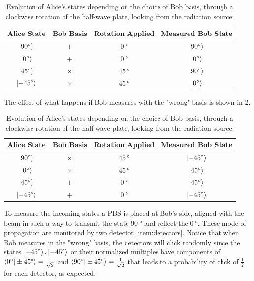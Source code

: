 \begin{table}[h]
\centering
\begin{tabular}{cccc}
  \toprule
  Alice State & Bob Basis & Rotation Applied & Measured Bob State \\
  \midrule
  $\ket{\SI{90}{\degree}}$            & $+$ & $\SI{0}{\degree}$ &
  $\ket{\SI{90}{\degree}}$  \\
  $\ket{\SI{0}{\degree}}$             & $+$ & $\SI{0}{\degree}$ &
  $\ket{\SI{0}{\degree}}$  \\
  $\ket{\SI{45}{\degree}}$            & $\times$ & $\SI{45}{\degree}$
  & $\ket{\SI{90}{\degree}}$   \\
  $\ket{\SI{-45}{\degree}}$       &  $\times$ & $\SI{45}{\degree}$ &
  $\ket{\SI{0}{\degree}}$  \\
  \bottomrule
\end{tabular}
\caption{Evolution of Alice's states depending on the choice of Bob basis,
  through a clockwise rotation of the half-wave plate, looking from the
radiation source.}
\label{tab:bob_evolution}

\end{table}

The effect of what happens if Bob measures with the "wrong" basis is shown in
\cref{tab:bob_evolution_wrong}.

\begin{table}[h]
\centering
\begin{tabular}{cccc}
  \toprule
  Alice State & Bob Basis & Rotation Applied & Measured Bob State \\
  \midrule
  $\ket{\SI{90}{\degree}}$            & $\times$ & $\SI{45}{\degree}$ &
  $\ket{\SI{-45}{\degree}}$  \\
  $\ket{\SI{0}{\degree}}$             & $\times$ & $\SI{45}{\degree}$ &
  $\ket{\SI{45}{\degree}}$  \\
  $\ket{\SI{45}{\degree}}$            & $+$ & $\SI{0}{\degree}$
  & $\ket{\SI{45}{\degree}}$   \\
  $\ket{\SI{-45}{\degree}}$       &  $+$ & $\SI{0}{\degree}$ &
  $\ket{\SI{-45}{\degree}}$  \\
  \bottomrule
\end{tabular}
\caption{Evolution of Alice's states depending on the choice of Bob basis,
  through a clockwise rotation of the half-wave plate, looking from the
radiation source.}
\label{tab:bob_evolution_wrong}
\end{table}

To measure the incoming states a PBS is placed at Bob's side, aligned
with the beam in
such a way to transmit the state $\SI{90}{\degree}$  and reflect the
$\SI{0}{\degree}$.
These mode of propagation are monitored by two detector
\ref{item:detectors}.
Notice that when Bob measures in the "wrong" basis, the detectors will
click randomly since the states  $\ket{\SI{-45}{\degree}},
\ket{\SI{-45}{\degree}}$ or
their normalized multiples have components of
$\braket{\SI{0}{\degree}|\SI{\pm45}{\degree}} = \frac{1}{\sqrt{2}}$ and
$\braket{\SI{90}{\degree}| \SI{\pm45}{\degree}} = \frac{1}{\sqrt{2}}$
that leads to a probability of click of $\frac{1}{2}$ for each
detector, as expected.
